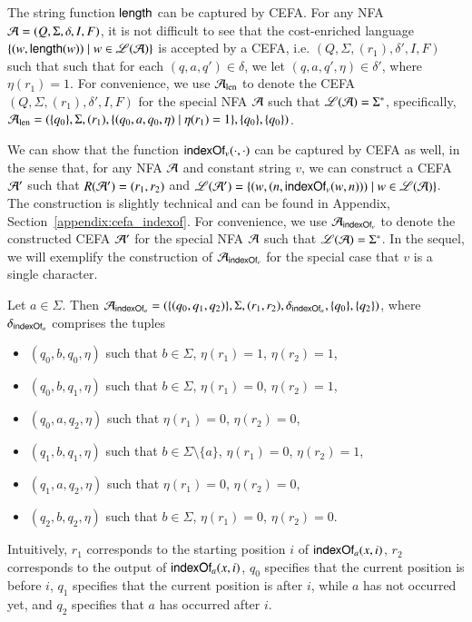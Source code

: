 \begin{example}\label{exm:len}
The string function $\mathsf{length}$ can be captured by CEFA. For any NFA $\mathcal{A}=(Q, \Sigma,  \delta, I, F)$, it is not difficult to see that the cost-enriched language $\{(w, \mathsf{length}(w)) \mid w\in \mathscr{L}(\mathcal{A})\}$ is accepted by a CEFA, i.e.
$(Q, \Sigma, (r_1), \delta', I, F)$ such that %
such that for each $(q, a, q')\in \delta$, we let $(q, a, q', \eta)\in \delta'$, where $\eta(r_1) = 1$. For convenience, we use $\mathcal{A}_{\rm len}$ to denote the CEFA $(Q, \Sigma, (r_1), \delta', I, F)$ for the special NFA $\mathcal{A}$ such that $\mathscr{L}(\mathcal{A})=\Sigma^*$, specifically, $\mathcal{A}_{\rm len} = (\{q_0\}, \Sigma, (r_1), \{(q_0, a, q_0, \eta) \mid \eta(r_1) = 1\}, \{q_0\}, \{q_0\})$.
\end{example}

We can show that the function $\mathsf{indexOf}_v(\cdot, \cdot)$ can be captured by CEFA as well, in the sense that, for any NFA $\mathcal{A}$ and constant string $v$, we can construct a CEFA $\mathcal{A}'$ such that $R(\mathcal{A}')=(r_1,r_2)$ and $\mathscr{L}(\mathcal{A}')=\{(w, (n, \mathsf{indexOf}_v(w, n)))\mid w\in \mathscr{L}(\mathcal{A}) \}$. The construction is slightly technical and can be found in Appendix, Section~\ref{appendix:cefa_indexof}.
For convenience, we use $\mathcal{A}_{\mathsf{indexOf}_v}$ to denote the constructed CEFA $\mathcal{A}'$ for the special NFA $\mathcal{A}$ such that $\mathscr{L}(\mathcal{A})=\Sigma^*$. In the sequel, we will exemplify the construction of $\mathcal{A}_{\mathsf{indexOf}_v}$ for the special case that $v$ is a single character. 

\begin{example}\label{exm:indexof}
Let $a \in \Sigma$. Then  $\mathcal{A}_{\mathsf{indexOf}_a} = (\{(q_0, q_1, q_2)\}, \Sigma, (r_1,r_2), \delta_{\mathsf{indexOf}_a}, \{q_0\}, \{q_2\})$, where $\delta_{\mathsf{indexOf}_a}$ comprises the tuples
\begin{itemize}
\item $(q_0, b, q_0, \eta)$ such that $b \in \Sigma$, $\eta(r_1)=1$, $\eta(r_2)=1$,
%
\item $(q_0, b, q_1, \eta)$ such that $b \in \Sigma$, $\eta(r_1)=0$, $\eta(r_2) = 1$,
%
\item $(q_0, a, q_2, \eta)$ such that $\eta(r_1)=0$, $\eta(r_2) = 0$,
%
\item $(q_1, b, q_1, \eta)$ such that $b \in \Sigma \setminus \{a\}$, $\eta(r_1)=0$, $\eta(r_2)=1$,
%
\item $(q_1, a, q_2, \eta)$ such that $\eta(r_1)=0$, $\eta(r_2)=0$,
%
\item $(q_2, b, q_2, \eta)$ such that $b \in \Sigma$, $\eta(r_1)=0$, $\eta(r_2)=0$.
\end{itemize}
Intuitively, $r_1$ corresponds to the starting position $i$ of $\mathsf{indexOf}_a(x, i)$, $r_2$ corresponds to the output of $\mathsf{indexOf}_a(x, i)$, $q_0$ specifies that the current position is before $i$, $q_1$ specifies that the current position is after $i$, while $a$ has not occurred yet, and $q_2$ specifies that $a$ has occurred after $i$. 
\end{example}


